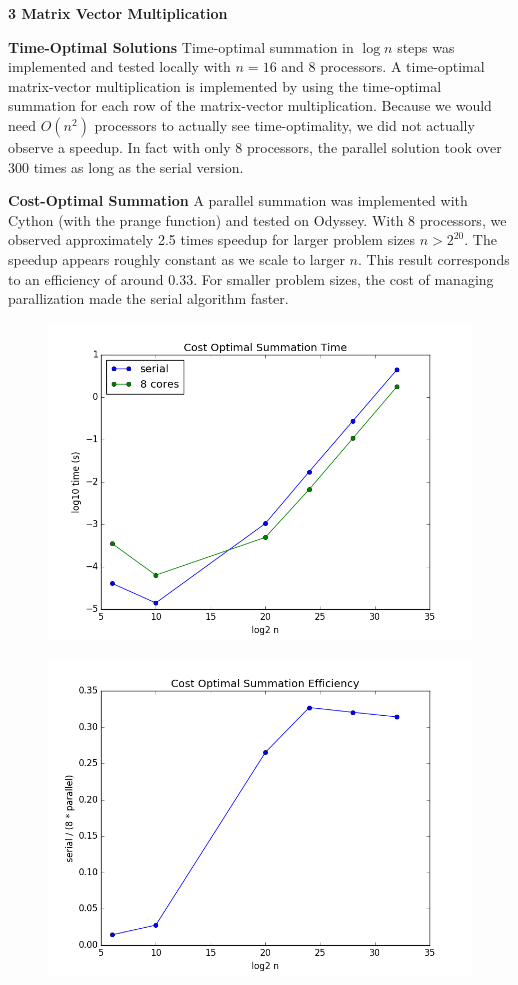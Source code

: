 \documentclass[11pt]{article}
\newcommand{\problem}{\FloatBarrier \medskip \noindent \textbf}
\begin{document}
\newpage

\problem{3 Matrix Vector Multiplication}

\problem{Time-Optimal Solutions}
Time-optimal summation in $\log n$ steps was implemented and tested locally with $n=16$ and 8 processors.
A time-optimal matrix-vector multiplication is implemented by using the time-optimal summation for each row of the matrix-vector multiplication.
Because we would need $O(n^2)$ processors to actually see time-optimality, we did not actually observe a speedup.
In fact with only 8 processors, the parallel solution took over 300 times as long as the serial version.

\problem{Cost-Optimal Summation}
A parallel summation was implemented with Cython (with the prange function) and tested on Odyssey.
With 8 processors, we observed approximately 2.5 times speedup for larger problem sizes $n > 2^{20}$.
The speedup appears roughly constant as we scale to larger $n$.
This result corresponds to an efficiency of around 0.33.
For smaller problem sizes, the cost of managing parallization made the serial algorithm faster.

\begin{figure}[h!]
\includegraphics[width=5in]{problem3add.png}
\end{figure}

\begin{figure}[h!]
\includegraphics[width=5in]{problem3addeff.png}
\end{figure}
\end{document}
